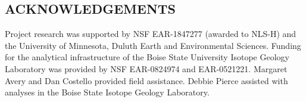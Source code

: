 \documentclass[11pt,letterpaper]{article}
\begin{document}

\subsection*{ACKNOWLEDGEMENTS}
Project research was supported by NSF EAR-1847277 (awarded to NLS-H) and the University of Minnesota, Duluth Earth and Environmental Sciences. Funding for the analytical infrastructure of the Boise State University Isotope Geology Laboratory was provided by NSF EAR-0824974 and EAR-0521221. Margaret Avery and Dan Costello provided field assistance. Debbie Pierce assisted with analyses in the Boise State Isotope Geology Laboratory.
\footnotesize

\singlespacing






\renewcommand{\thetable}{DR\arabic{table}}
\end{document}

